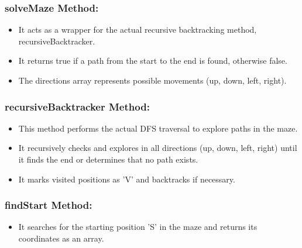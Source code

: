 \documentclass[12pt]{report}
\begin{document}
\subsubsection{solveMaze Method:}

\begin{itemize}
    \item It acts as a wrapper for the actual recursive backtracking method, recursiveBacktracker.
\end{itemize}

\begin{itemize}
    \item It returns true if a path from the start to the end is found, otherwise false.
\end{itemize}

\begin{itemize}
    \item The directions array represents possible movements (up, down, left, right).
\end{itemize}


\subsubsection{recursiveBacktracker Method:}

\begin{itemize}
    \item This method performs the actual DFS traversal to explore paths in the maze.
\end{itemize}

\begin{itemize}
    \item It recursively checks and explores in all directions (up, down, left, right) until it finds the end or determines that no path exists.
\end{itemize}
\begin{itemize}
    \item It marks visited positions as 'V' and backtracks if necessary.
\end{itemize}

\subsubsection{findStart Method:}

\begin{itemize}
    \item It searches for the starting position 'S' in the maze and returns its coordinates as an array.
\end{itemize}
\end{document}
